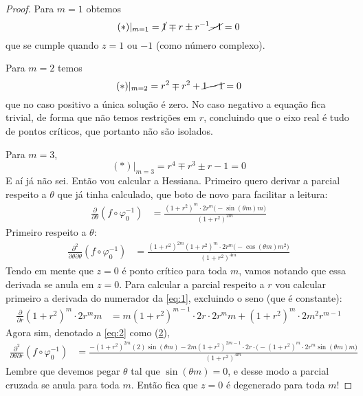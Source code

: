 \begin{proof}
Para \(m=1\) obtemos
\[(*)|_{m=1}=\cancel{1} \mp r \pm  r^{-1}\cancel{-1}=0\]
que se cumple quando \(z=1\) ou \(-1\) (como  número complexo).

Para \(m=2\) temos
\[(*)|_{m=2}=r^{2} \mp  r^2 +  \cancel{1-1} = 0\]
que no caso positivo a única solução é zero. No caso negativo a equação fica trivial, de forma que não temos restrições em \(r\), concluindo que o eixo real é tudo de pontos críticos, que portanto não são isolados.

Para \(m=3\),
\[(*)|_{m=3}=r^4 \mp  r^3 \pm  r-1=0\]
E aí já não sei. Então vou calcular a Hessiana. Primeiro quero derivar a parcial respeito a \(\theta\) que já tinha calculado, que boto de novo para facilitar a leitura:
\begin{align}\label{eq:1}
\frac{\partial }{\partial \theta}(f \circ \varphi_0^{-1})&= \frac{(1+r^2)^m\cdot  2r^m \Big(-\sin(\theta m)m\Big)}{(1+r^2)^{2m}}
\end{align}
Primeiro respeito a \(\theta\):
\begin{align*}
\frac{\partial^2 }{\partial \theta\partial \theta}(f \circ \varphi_0^{-1})&=\frac{(1+r^2)^{2m}(1+r^2)^m\cdot 2r^m \Big(-\cos(\theta m)m^2\Big)}{(1+r^2)^{4m}}
\end{align*}
Tendo em mente que \(z=0\)  é ponto crítico para toda \(m\), vamos notando que essa derivada se anula em \(z=0\). Para calcular a parcial respeito a \(r\) vou calcular primeiro a derivada do numerador da \cref{eq:1}, excluindo o seno (que é constante):
\begin{align}\label{eq:2}
\frac{\partial }{\partial r}(1+r^2)^m\cdot 2r^m m&=m(1+r^2)^{m-1}\cdot 2r\cdot 2r^m m+(1+r^2)^m \cdot 2m^2r^{m-1}
\end{align}
Agora sim, denotado a \cref{eq:2} como (\hyperref[eq:2]{2}),
\begin{align*}
\frac{\partial^2 }{\partial \theta\partial r}(f \circ \varphi_0^{-1})&=\frac{-(1+r^2)^{2m}(\hyperref[eq:2]{2})\sin(\theta m)-2m(1+r^2)^{2m-1}\cdot 2r\cdot \Big(-(1+r^2)^m\cdot 2r^m \sin(\theta m)m\Big)}{(1+r^2)^{4m}}
\end{align*}
Lembre que devemos pegar \(\theta\) tal que \(\sin(\theta m)=0\), e desse modo a parcial cruzada se anula para toda \(m\). Então fica que \(z=0\) é degenerado para toda \(m\)!


\end{proof}
